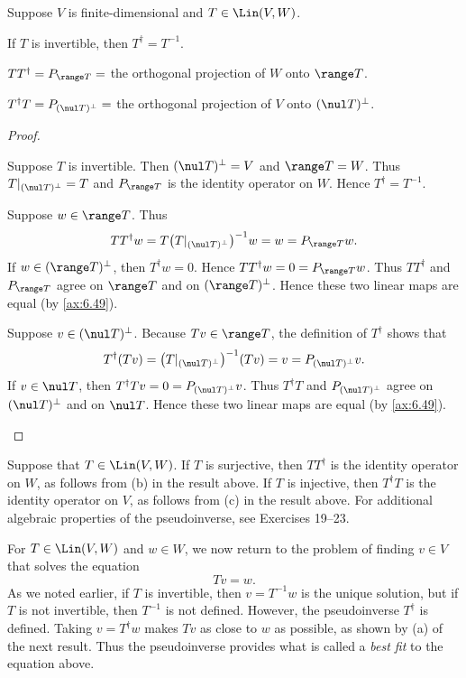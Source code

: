 \begin{result}\label{ax:6.69}
Suppose $V$ is finite-dimensional and $T\in\Lin(V,W)$.
\begin{parts}
\item If $T$ is invertible, then $T^\dagger=T^{-1}$.
\item $TT^\dagger=P_{\range T}=$ the orthogonal projection of $W$ onto
  $\range T$.
\item $T^\dagger T=P_{(\nul T)^\perp}=$ the orthogonal projection of $V$ onto
  $(\nul T)^\perp$.
\end{parts}
\end{result}

\begin{proof}\leavevmode
\begin{parts}
\item Suppose $T$ is invertible. Then $(\nul T)^\perp=V$ and $\range T=W$.
  Thus $T|_{(\nul T)^\perp}=T$ and $P_{\range T}$ is the identity operator on
  $W$. Hence $T^\dagger=T^{-1}$.
\item Suppose $w\in\range T$. Thus
  \[ TT^\dagger w = T\bigl(T|_{(\nul T)^\perp}\bigr)^{-1}w = w
     = P_{\range T}w. \]
  If $w\in(\range T)^\perp$, then $T^\dagger w=0$. Hence
  $TT^\dagger w=0=P_{\range T}w$. Thus $TT^\dagger$ and $P_{\range T}$ agree on
  $\range T$ and on $(\range T)^\perp$. Hence these two linear maps are equal
  (by \ref{ax:6.49}).
\item Suppose $v\in(\nul T)^\perp$. Because $Tv\in\range T$, the definition of
  $T^\dagger$ shows that
  \[ T^\dagger(Tv) = \bigl(T|_{(\nul T)^\perp}\bigr)^{-1}(Tv) = v
     = P_{(\nul T)^\perp}v. \]
  If $v\in\nul T$, then $T^\dagger Tv=0=P_{(\nul T)^\perp}v$. Thus
  $T^\dagger T$ and $P_{(\nul T)^\perp}$ agree on $(\nul T)^\perp$ and on
  $\nul T$. Hence these two linear maps are equal (by \ref{ax:6.49}).
  \qedhere
\end{parts}
\end{proof}

%
Suppose that $T\in\Lin(V,W)$. If $T$ is surjective, then $TT^\dagger$ is the
identity operator on $W$, as follows from (b) in the result above. If $T$ is
injective, then $T^\dagger T$ is the identity operator on $V$, as follows from
(c) in the result above. For additional algebraic properties of the
pseudoinverse, see Exercises 19--23.

For $T\in\Lin(V,W)$ and $w\in W$, we now return to the problem of finding
$v\in V$ that solves the equation
\[ Tv = w. \]
As we noted earlier, if $T$ is invertible, then $v=T^{-1}w$ is the unique
solution, but if $T$ is not invertible, then $T^{-1}$ is not defined. However,
the pseudoinverse $T^\dagger$ is defined. Taking $v=T^\dagger w$ makes $Tv$ as
close to $w$ as possible, as shown by (a) of the next result. Thus the
pseudoinverse provides what is called a \emph{best fit} to the equation above.

